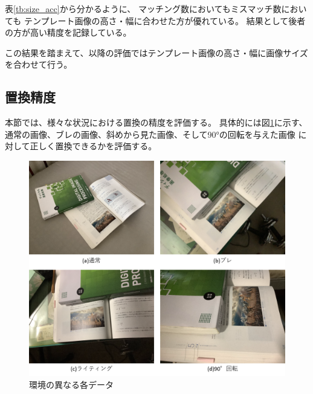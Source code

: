 表\ref{tb:size_acc}から分かるように、
マッチング数においてもミスマッチ数においても
テンプレート画像の高さ・幅に合わせた方が優れている。
結果として後者の方が高い精度を記録している。

この結果を踏まえて、以降の評価ではテンプレート画像の高さ・幅に画像サイズを合わせて行う。

\subsection{置換精度}
本節では、様々な状況における置換の精度を評価する。
具体的には図\ref{fig:env_data}に示す、
通常の画像、ブレの画像、斜めから見た画像、そして90°の回転を与えた画像
に対して正しく置換できるかを評価する。

\begin{figure}[h]
    \centering
    \includegraphics[width=1\linewidth]{fig/env_data.png}
    \caption{環境の異なる各データ}
    \label{fig:env_data}
\end{figure}

